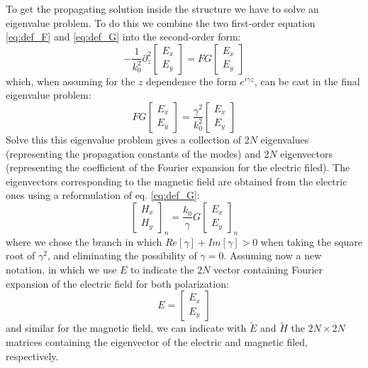 \documentclass[a4paper,10pt]{report}
\begin{document}
To get the propagating solution inside the structure we have to solve an eigenvalue problem. To do this we combine the two first-order equation \ref{eq:def_F} and \ref{eq:def_G} into the second-order form:
\begin{equation}
-\frac{1}{k_0^2} \partial_z^2 \left[ \begin{array}{c} E_x \\ E_y \end{array} \right] = FG \left[ \begin{array}{c} E_x \\ E_y \end{array} \right]
\end{equation}
which, when assuming for the $z$ dependence the form $e^{i\gamma z}$, can be cast in the final eigenvalue problem:
\begin{equation}
FG \left[ \begin{array}{c} E_x \\ E_y \end{array} \right] = \frac{\gamma^2}{k_0^2} \left[ \begin{array}{c} E_x \\ E_y \end{array} \right]
\end{equation}
Solve this this eigenvalue problem gives a collection of $2N$ eigenvalues (representing the propagation constants of the modes) and $2N$ eigenvectors (representing the coefficient of the Fourier expansion for the electric filed). The eigenvectors corresponding to the magnetic field are obtained from the electric ones using a reformulation of eq. \ref{eq:def_G}:
\begin{equation}
\left[ \begin{array}{c} H_x \\ H_y \end{array} \right]_n = \frac{k_0}{\gamma} G \left[ \begin{array}{c} E_x \\ E_y \end{array} \right]_n
\end{equation}
where we chose the branch in which $Re[\gamma] + Im[\gamma]>0$ when taking the square root of $\gamma^2$, and eliminating the possibility of $\gamma=0$.
Assuming now a new notation, in which we use $E$ to indicate the $2N$ vector containing Fourier expansion of the electric field for both polarization:
\begin{equation}
E = \left[ \begin{array}{c} E_x \\ E_y \end{array} \right]
\end{equation} 
and similar for the magnetic field, we can indicate with $\tilde{E}$ and $\tilde{H}$ the $2N \times 2N$ matrices containing the eigenvector of the electric and magnetic filed, respectively. 
\end{document}
